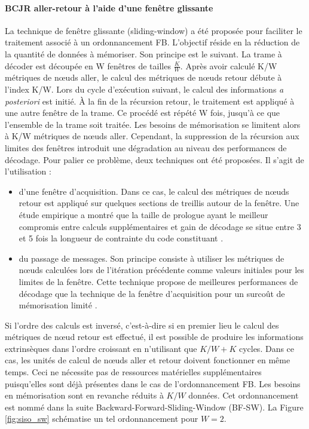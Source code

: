 \paragraph*{BCJR aller-retour à l'aide d'une fenêtre glissante}
La technique de fenêtre glissante (sliding-window) a été proposée pour faciliter le traitement associé à un ordonnancement
FB. L'objectif réside en
la réduction de la quantité de données à mémoriser. Son principe est le suivant. La trame à décoder est découpée en W fenêtres 
de tailles $\frac{K}{W}$. Après avoir calculé K/W métriques de nœuds aller, le calcul des métriques de nœuds retour débute à l'index K/W. 
Lors du cycle d'exécution suivant, le calcul des informations \textit{a posteriori} est initié. À la fin de la 
récursion retour, le traitement est appliqué à une autre fenêtre de la trame. Ce procédé est répété W fois, jusqu'à ce que l'ensemble de la trame
soit traitée. Les besoins de mémorisation se limitent alors à K/W métriques de nœuds aller.
Cependant, la suppression de la 
récursion aux limites des fenêtres introduit une dégradation au niveau des performances de décodage. Pour palier ce problème, deux 
techniques ont été proposées. Il s'agit de l'utilisation : 
\begin{itemize}
	\item d'une fenêtre d'acquisition. Dans ce cas, le calcul des métriques de nœuds retour est appliqué sur 
	quelques sections de treillis autour de la fenêtre. Une étude empirique a montré que la 
	taille de prologue ayant le meilleur compromis entre calculs supplémentaires et gain de 
	décodage se situe entre 3 et 5 fois la longueur de contrainte du code constituant \cite{sw_init}.
	\item du passage de messages. Son principe consiste à utiliser les métriques de nœuds calculées lors de l'itération 
	précédente comme valeurs initiales pour les limites de la fenêtre. Cette technique propose de meilleures 
	performances de décodage que la technique de la fenêtre d'acquisition pour un surcoût de mémorisation limité \cite{muller2006}.\vspace*{1ex}
\end{itemize}

Si l'ordre des calculs est inversé, c'est-à-dire si en premier lieu le calcul des métriques de nœud retour est 
effectué, il est possible de produire les informations extrinsèques dans l'ordre croissant en n'utilisant que $K/W + K$
cycles. Dans ce cas, les unités de calcul de nœuds aller et retour doivent fonctionner en même temps. Ceci ne 
nécessite pas de ressources matérielles supplémentaires puisqu'elles sont déjà présentes dans le cas de l'ordonnancement 
FB. Les besoins en mémorisation sont en revanche réduits à $K/W$ données. Cet ordonnancement est nommé dans la suite 
Backward-Forward-Sliding-Window (BF-SW). La Figure \ref{fig:siso_sw} schématise un tel ordonnancement pour $W=2$.

